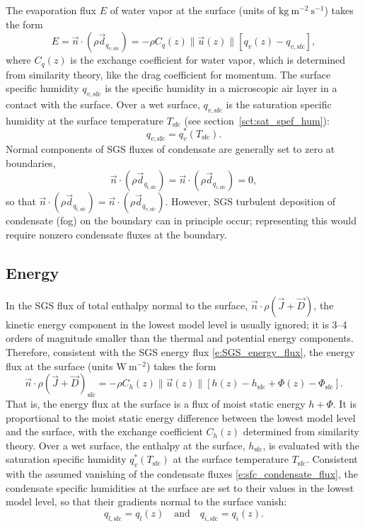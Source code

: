 \documentclass{report}
\begin{document}
The evaporation flux $E$ of water vapor at the surface (units of $\mathrm{kg~m^{-2}~s^{-1}}$) takes the form 
\begin{equation}\label{e:sfc_evaporation}
E = \vec{n} \cdot (\rho \vec{d}_{q_{v, \mathrm{sfc}}}) = - \rho C_q(z) \| \vec{u}(z) \| \left[q_{v}(z) - q_{v, \mathrm{sfc}} \right],
\end{equation} 
where $C_q(z)$ is the exchange coefficient for water vapor, which is determined from similarity theory, like the drag coefficient for momentum. The surface specific humidity $q_{v, \mathrm{sfc}}$ is the specific humidity in a microscopic air layer in a contact with the surface. Over a wet surface, $q_{v, \mathrm{sfc}}$ is the saturation specific humidity at the surface temperature $T_\mathrm{sfc}$ (see section~\ref{sct:sat_spef_hum}): 
\[
q_{v, \mathrm{sfc}}=q_v^*(T_\mathrm{sfc}).
\]
Normal components of SGS fluxes of condensate are generally set to zero at boundaries,
\begin{equation}\label{e:sfc_condensate_flux}
\vec{n} \cdot (\rho \vec{d}_{q_{l, \mathrm{sfc}}}) = \vec{n} \cdot (\rho \vec{d}_{q_{i, \mathrm{sfc}}}) = 0,
\end{equation}
so that $\vec{n} \cdot (\rho \vec{d}_{q_{t, \mathrm{sfc}}}) = \vec{n} \cdot (\rho \vec{d}_{q_{v, \mathrm{sfc}}})$. However, SGS turbulent deposition of condensate (fog) on the boundary can in principle occur; representing this would require nonzero condensate fluxes at the boundary. 
\subsection{Energy}

In the SGS flux of total enthalpy normal to the surface, $\vec{n} \cdot \rho (\vec{J} + \vec{D})$, the kinetic energy component in the lowest model level is usually ignored; it is 3--4 orders of magnitude smaller than the thermal and potential energy components. Therefore, consistent with the SGS energy flux \eqref{e:SGS_energy_flux}, the energy flux at the surface (units $\mathrm{W~m^{-2}}$) takes the form
\begin{equation}\label{e:sfc_energy_flux}
\vec{n} \cdot \rho (\vec{J} + \vec{D})_\mathrm{sfc} = -\rho C_h(z) \| \vec{u}(z) \| \left[ h(z) - h_\mathrm{sfc} + \Phi(z) - \Phi_\mathrm{sfc} \right].
\end{equation}
That is, the energy flux at the surface is a flux of moist static energy $h + \Phi$. It is proportional to the moist static energy  difference between the lowest model level and the surface, with the exchange coefficient $C_h(z)$ determined from similarity theory. Over a wet surface, the enthalpy at the surface, $h_\mathrm{sfc}$, is evaluated with the saturation specific humidity $q_v^*(T_\mathrm{sfc})$ at the surface temperature $T_\mathrm{sfc}$. Consistent with the assumed vanishing of the condensate fluxes \eqref{e:sfc_condensate_flux}, the condensate specific humidities at the surface are set to their values in the lowest model level, so that their gradients normal to the surface vanish:
\[
q_{l, \mathrm{sfc}} = q_l(z) \quad \text{and} \quad q_{i, \mathrm{sfc}} = q_i(z).
\]
\end{document}
